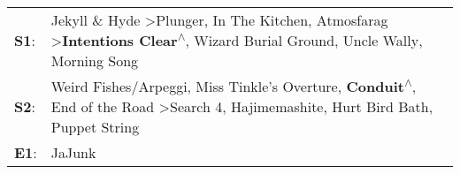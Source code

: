 \begin{supertabular}{p{0.03\textwidth}p{0.92\textwidth}}
 \textbf{S1}:  &  Jekyll \& Hyde\textsuperscript{} \textgreater \enspace Plunger\textsuperscript{}, \enspace In The Kitchen\textsuperscript{}, \enspace Atmosfarag\textsuperscript{} \textgreater \enspace \textbf{Intentions Clear\textsuperscript{$\wedge$}}, \enspace Wizard Burial Ground\textsuperscript{}, \enspace Uncle Wally\textsuperscript{}, \enspace Morning Song\textsuperscript{}  \enspace  \\
 \textbf{S2}:  &      Weird Fishes/Arpeggi\textsuperscript{}, \enspace Miss Tinkle's Overture\textsuperscript{}, \enspace \textbf{Conduit\textsuperscript{$\wedge$}}, \enspace End of the Road\textsuperscript{} \textgreater \enspace Search 4\textsuperscript{}, \enspace Hajimemashite\textsuperscript{}, \enspace Hurt Bird Bath\textsuperscript{}, \enspace Puppet String\textsuperscript{}  \enspace  \\
 \textbf{E1}:  &                                                                                                                                                                                                                                                                                                                                                        JaJunk\textsuperscript{}  \enspace  \\
\end{supertabular}
